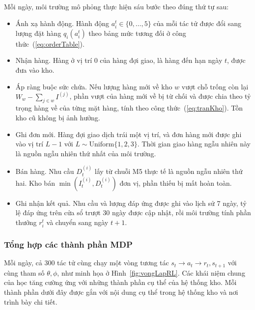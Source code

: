 Mỗi ngày, môi trường mô phỏng thực hiện sáu bước theo đúng thứ tự sau:
\begin{itemize}
    \item Ánh xạ hành động. Hành động $a_i^t \in \{0,\ldots,5\}$ của mỗi tác tử được đổi sang lượng đặt hàng $q_i(a_i^t)$ theo bảng mức tương đối ở công thức~(\ref{eq:orderTable}).
    \item Nhận hàng. Hàng ở vị trí 0 của hàng đợi giao, là hàng đến hạn ngày $t$, được đưa vào kho.
    \item Áp ràng buộc sức chứa. Nếu lượng hàng mới về kho $w$ vượt chỗ trống còn lại $W_w - \sum_{j \in w} I^{(j)}$, phần vượt của hàng mới về bị từ chối và được chia theo tỷ trọng hàng về của từng mặt hàng, tính theo công thức~(\ref{eq:tranKho}). Tồn kho cũ không bị ảnh hưởng.
    \item Ghi đơn mới. Hàng đợi giao dịch trái một vị trí, và đơn hàng mới được ghi vào vị trí $L-1$ với $L \sim \mathrm{Uniform}\{1, 2, 3\}$. Thời gian giao hàng ngẫu nhiên này là nguồn ngẫu nhiên thứ nhất của môi trường.
    \item Bán hàng. Nhu cầu $D_t^{(i)}$ lấy từ chuỗi M5 thực tế là nguồn ngẫu nhiên thứ hai. Kho bán $\min(I_t^{(i)}, D_t^{(i)})$ đơn vị, phần thiếu bị mất hoàn toàn.
    \item Ghi nhận kết quả. Nhu cầu và lượng đáp ứng được ghi vào lịch sử 7 ngày, tỷ lệ đáp ứng trên cửa sổ trượt 30 ngày được cập nhật, rồi môi trường tính phần thưởng $r_i^t$ và chuyển sang ngày $t+1$.
\end{itemize}

\subsubsection{Tổng hợp các thành phần MDP}

Mỗi ngày, cả 300 tác tử cùng chạy một vòng tương tác $s_t \rightarrow a_t \rightarrow r_t, s_{t+1}$ với cùng tham số $\theta, \phi$, như minh họa ở Hình~\ref{fig:vongLapRL}. Các khái niệm chung của học tăng cường ứng với những thành phần cụ thể của hệ thống kho. Mỗi thành phần dưới đây được gắn với nội dung cụ thể trong hệ thống kho và nơi trình bày chi tiết.

